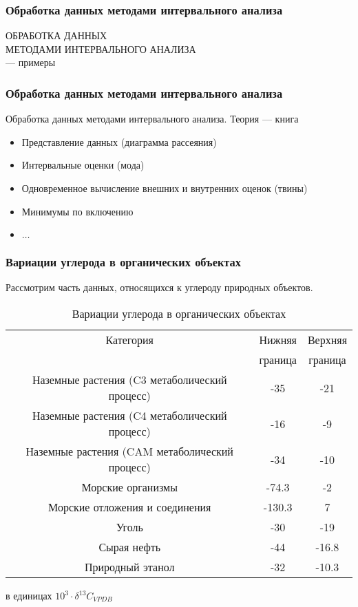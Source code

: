 \begin{frame}
\frametitle{Обработка данных методами интервального анализа}


\begin{center}	
ОБРАБОТКА ДАННЫХ \\
МЕТОДАМИ ИНТЕРВАЛЬНОГО АНАЛИЗА \\
--- примеры
\end{center}

\end{frame}


\begin{frame}
	\frametitle{Обработка данных методами интервального анализа}
Обработка данных методами интервального анализа. Теория --- книга	\cite{BookIntStat}
\begin{itemize}
	\item Представление данных (диаграмма рассеяния)
	\item Интервальные оценки (мода)
	\item Одновременное вычисление внешних и внутренних оценок (твины)
	\item Минимумы по включению
	\item $\ldots$
\end{itemize}
	
\end{frame}


\begin{frame}
	\frametitle{Вариации углерода в органических объектах}
	
Рассмотрим часть данных, относящихся к углероду природных объектов. 

\begin{table}[h!]
	\begin{center}
		{\small
			\begin{tabular}{ccc}
				\hline
				Категория & Нижняя & Верхняя \\
				~ & граница & граница \\ 
				\hline
				Наземные растения (C3 метаболический процесс)	& -35 & -21 \\
				Наземные растения (C4 метаболический процесс)	& -16 & -9 \\
				Наземные растения  (CAM метаболический процесс)	& -34 & -10 \\
				\hline
				Морские организмы 	& -74.3 & -2 \\
				Морские отложения и соединения &	-130.3 & 7 \\
				\hline
				Уголь &	-30 & -19 \\
				Сырая нефть &	-44 & -16.8 \\
				Природный этанол & -32 &  -10.3 \\
				\hline
			\end{tabular}
		}
		\caption{Вариации углерода в органических объектах} в единицах $10^3 \cdot \delta ^{13}C_{VPDB}$
		\label{t:OrganicCarbonVariation}
	\end{center}
\end{table}
	
\end{frame}



